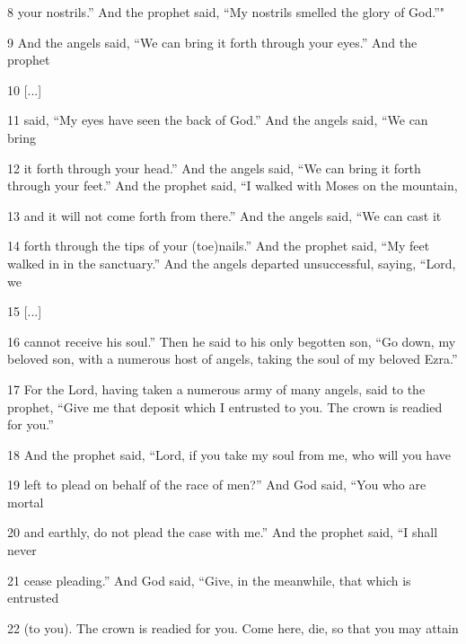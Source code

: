 \par 8 your nostrils.” And the prophet said, “My nostrils smelled the glory of God.”"

\par 9 And the angels said, “We can bring it forth through your eyes.” And the prophet

\par 10 [...]

\par 11 said, “My eyes have seen the back of God.” And the angels said, “We can bring

\par 12 it forth through your head.” And the angels said, “We can bring it forth through your feet.” And the prophet said, “I walked with Moses on the mountain,

\par 13 and it will not come forth from there.” And the angels said, “We can cast it

\par 14 forth through the tips of your (toe)nails.” And the prophet said, “My feet walked in in the sanctuary.” And the angels departed unsuccessful, saying, “Lord, we

\par 15 [...]

\par 16 cannot receive his soul.” Then he said to his only begotten son, “Go down, my beloved son, with a numerous host of angels, taking the soul of my beloved Ezra.”

\par 17 For the Lord, having taken a numerous army of many angels, said to the prophet, “Give me that deposit which I entrusted to you. The crown is readied for you.”

\par 18 And the prophet said, “Lord, if you take my soul from me, who will you have

\par 19 left to plead on behalf of the race of men?” And God said, “You who are mortal

\par 20 and earthly, do not plead the case with me.” And the prophet said, “I shall never

\par 21 cease pleading.” And God said, “Give, in the meanwhile, that which is entrusted

\par 22 (to you). The crown is readied for you. Come here, die, so that you may attain

